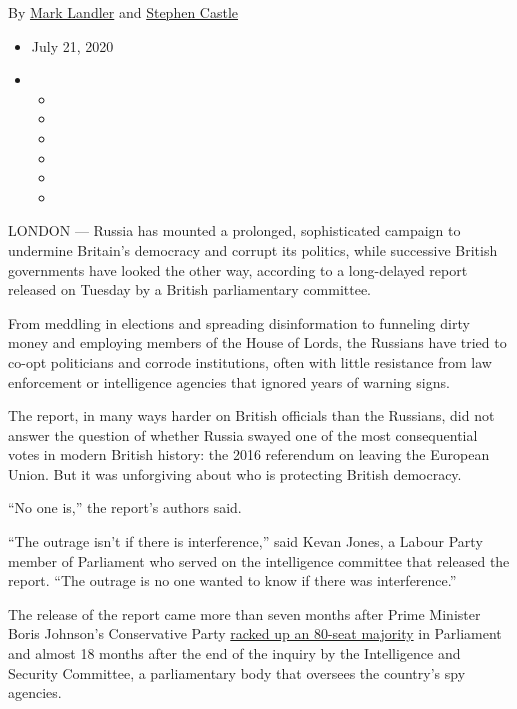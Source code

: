 By \href{https://www.nytimes.com/by/mark-landler}{Mark Landler} and
\href{https://www.nytimes.com/by/stephen-castle}{Stephen Castle}

\begin{itemize}
\item
  July 21, 2020
\item
  \begin{itemize}
  \item
  \item
  \item
  \item
  \item
  \item
  \end{itemize}
\end{itemize}

LONDON --- Russia has mounted a prolonged, sophisticated campaign to
undermine Britain's democracy and corrupt its politics, while successive
British governments have looked the other way, according to a
long-delayed report released on Tuesday by a British parliamentary
committee.

From meddling in elections and spreading disinformation to funneling
dirty money and employing members of the House of Lords, the Russians
have tried to co-opt politicians and corrode institutions, often with
little resistance from law enforcement or intelligence agencies that
ignored years of warning signs.

The report, in many ways harder on British officials than the Russians,
did not answer the question of whether Russia swayed one of the most
consequential votes in modern British history: the 2016 referendum on
leaving the European Union. But it was unforgiving about who is
protecting British democracy.

``No one is,'' the report's authors said.

``The outrage isn't if there is interference,'' said Kevan Jones, a
Labour Party member of Parliament who served on the intelligence
committee that released the report. ``The outrage is no one wanted to
know if there was interference.''

The release of the report came more than seven months after Prime
Minister Boris Johnson's Conservative Party
\href{https://www.nytimes.com/2019/12/12/world/europe/uk-election-boris-johnson.html}{racked
up an 80-seat majority} in Parliament and almost 18 months after the end
of the inquiry by the Intelligence and Security Committee, a
parliamentary body that oversees the country's spy agencies.


